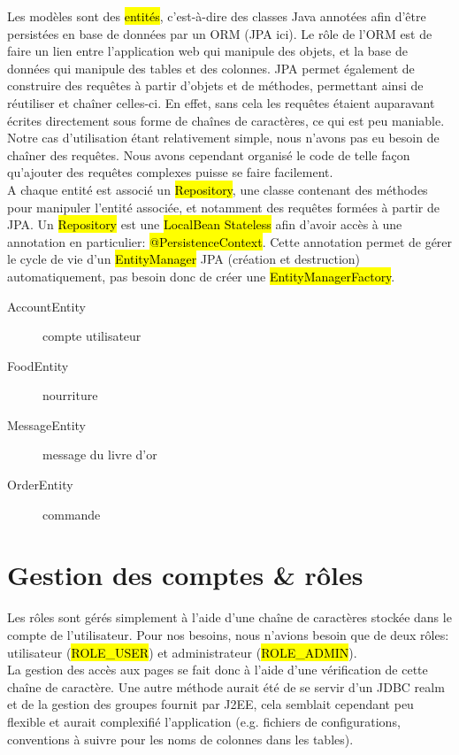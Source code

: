 Les modèles sont des \hl{entit\'es}, c'est-à-dire des classes Java annotées afin
d'être persistées en base de données par un ORM (JPA ici). Le rôle de l'ORM est
de faire un lien entre l'application web qui manipule des objets, et la base de
données qui manipule des tables et des colonnes. JPA permet également de
construire des requêtes à partir d'objets et de méthodes, permettant ainsi de
réutiliser et chaîner celles-ci. En effet, sans cela les requêtes étaient
auparavant écrites directement sous forme de chaînes de caractères, ce qui est
peu maniable.\\

Notre cas d'utilisation étant relativement simple, nous n'avons pas eu besoin
de chaîner des requêtes. Nous avons cependant organisé le code de telle façon
qu'ajouter des requêtes complexes puisse se faire facilement.\\

A chaque entité est associé un \hl{Repository}, une classe contenant des méthodes
pour manipuler l'entité associée, et notamment des requêtes formées à partir
de JPA. Un \hl{Repository} est une \hl{LocalBean Stateless} afin d'avoir
accès à une annotation en particulier: \hl{@PersistenceContext}. Cette
annotation permet de gérer le cycle de vie d'un \hl{EntityManager} JPA
(création et destruction) automatiquement, pas besoin donc de créer une
\hl{EntityManagerFactory}.\\

\begin{description}
    \item[AccountEntity] compte utilisateur
    \item[FoodEntity] nourriture
    \item[MessageEntity] message du livre d'or
    \item[OrderEntity] commande
\end{description}

\section{Gestion des comptes \& rôles}

Les rôles sont gérés simplement à l'aide d'une chaîne de caractères stockée dans
le compte de l'utilisateur. Pour nos besoins, nous n'avions besoin que de deux
rôles: utilisateur (\hl{ROLE\_USER}) et administrateur (\hl{ROLE\_ADMIN}).\\

La gestion des accès aux pages se fait donc à l'aide d'une vérification de cette
chaîne de caractère. Une autre méthode aurait été de se servir d'un JDBC realm
et de la gestion des groupes fournit par J2EE, cela semblait cependant peu
flexible et aurait complexifié l'application (e.g. fichiers de configurations,
conventions à suivre pour les noms de colonnes dans les tables).
